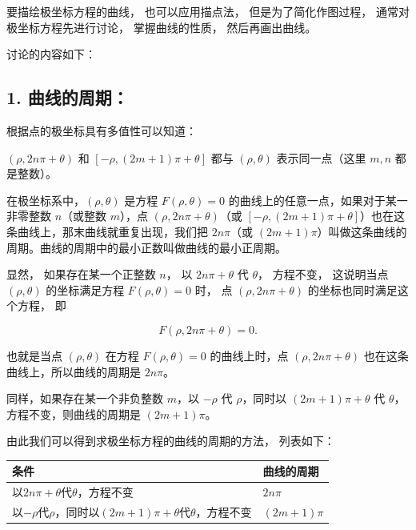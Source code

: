 要描绘极坐标方程的曲线， 也可以应用描点法， 但是为了简化作图过程，
通常对极坐标方程先进行讨论， 掌握曲线的性质， 然后再画出曲线。

讨论的内容如下：

\subsection{1. 曲线的周期：}\label{ux66f2ux7ebfux7684ux5468ux671f}

根据点的极坐标具有多值性可以知道：

\((\rho, 2n\pi + \theta)\) 和 \([- \rho, (2m + 1)\pi + \theta]\) 都与
\((\rho, \theta)\) 表示同一点（这里 \(m, n\) 都是整数）。

在极坐标系中，\((\rho, \theta)\) 是方程 \(F(\rho, \theta) = 0\)
的曲线上的任意一点，如果对于某一非零整数 \(n\)（或整数 \(m\)），点
\((\rho, 2n\pi + \theta)\)（或
\([- \rho, (2m + 1)\pi + \theta]\)）也在这条曲线上，那末曲线就重复出现，我们把
\(2n\pi\)（或
\((2m + 1)\pi\)）叫做这条曲线的周期。曲线的周期中的最小正数叫做曲线的最小正周期。

显然， 如果存在某一个正整数 \(n\)， 以 \(2n\pi + \theta\) 代
\(\theta\)， 方程不变， 这说明当点 \((\rho, \theta)\) 的坐标满足方程
\(F(\rho, \theta) = 0\) 时， 点 \((\rho, 2n\pi + \theta)\)
的坐标也同时满足这个方程， 即

\[
F (\rho, 2 n \pi + \theta) = 0.
\]

也就是当点 \((\rho, \theta)\) 在方程 \(F(\rho, \theta) = 0\)
的曲线上时，点 \((\rho, 2n\pi + \theta)\)
也在这条曲线上，所以曲线的周期是 \(2n\pi\)。

同样，如果存在某一个非负整数 \(m\)，以 \(-\rho\) 代 \(\rho\)，同时以
\((2m + 1)\pi + \theta\) 代 \(\theta\)，方程不变，则曲线的周期是
\((2m + 1)\pi\)。

由此我们可以得到求极坐标方程的曲线的周期的方法， 列表如下：

{\def\LTcaptype{none} %
\begin{longtable}[]{@{}
  >{\raggedright\arraybackslash}p{}
  >{\raggedright\arraybackslash}p{}@{}}
\toprule\noalign{}
\begin{minipage}[b]{\linewidth}\raggedright
条件
\end{minipage} & \begin{minipage}[b]{\linewidth}\raggedright
曲线的周期
\end{minipage} \\
\midrule\noalign{}
\endhead
\bottomrule\noalign{}
\endlastfoot
以\(2n\pi+\theta\)代\(\theta\)，方程不变 & \(2n\pi\) \\
以\(-\rho\)代\(\rho\)，同时以\((2m+1)\pi+\theta\)代\(\theta\)，方程不变
& \((2m+1)\pi\) \\
\end{longtable}
}

